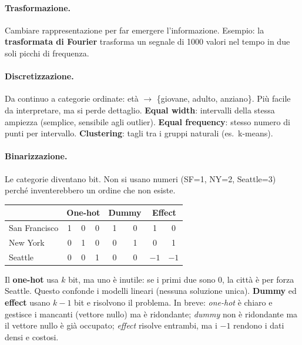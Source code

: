 \paragraph*{Trasformazione.} Cambiare rappresentazione per far emergere l'informazione. Esempio: la \textbf{trasformata di Fourier} trasforma un segnale di 1000 valori nel tempo in due soli picchi di frequenza.

\paragraph*{Discretizzazione.} Da continuo a categorie ordinate: età $\to$ \{giovane, adulto, anziano\}. Più facile da interpretare, ma si perde dettaglio.
\textbf{Equal width}: intervalli della stessa ampiezza (semplice, sensibile agli outlier).
\textbf{Equal frequency}: stesso numero di punti per intervallo.
\textbf{Clustering}: tagli tra i gruppi naturali (es.\ k-means).

\paragraph*{Binarizzazione.} Le categorie diventano bit. Non si usano numeri (SF=1, NY=2, Seattle=3) perché inventerebbero un ordine che non esiste.
\begin{center}
    \small
    \begin{tabular}{@{}l|ccc|cc|cc@{}}
        \toprule
        & \multicolumn{3}{c|}{\textbf{One-hot}} & \multicolumn{2}{c|}{\textbf{Dummy}} & \multicolumn{2}{c}{\textbf{Effect}} \\
        \midrule
        San Francisco & 1 & 0 & 0 & 1 & 0 & 1 & 0 \\
        New York      & 0 & 1 & 0 & 0 & 1 & 0 & 1 \\
        Seattle       & 0 & 0 & 1 & 0 & 0 & $-1$ & $-1$ \\
        \bottomrule
    \end{tabular}
\end{center}

Il \textbf{one-hot} usa $k$ bit, ma uno è inutile: se i primi due sono $0$, la città è per forza Seattle. Questo confonde i modelli lineari (nessuna soluzione unica). \textbf{Dummy} ed \textbf{effect} usano $k-1$ bit e risolvono il problema.
In breve: \emph{one-hot} è chiaro e gestisce i mancanti (vettore nullo) ma è ridondante; \emph{dummy} non è ridondante ma il vettore nullo è già occupato; \emph{effect} risolve entrambi, ma i $-1$ rendono i dati densi e costosi.

